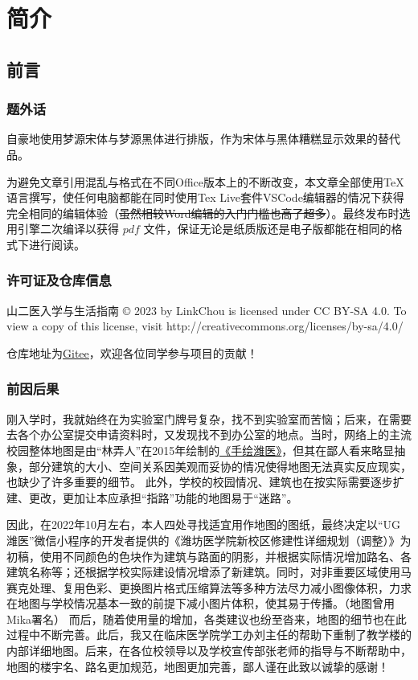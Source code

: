 \chapter[简介]{简介}

\section[前言]{前言}
\subsection[题外话]{题外话}
自豪地使用梦源宋体与梦源黑体进行排版，作为宋体与黑体糟糕显示效果的替代品。

为避免文章引用混乱与格式在不同Office版本上的不断改变，本文章全部使用\TeX 语言撰写，使任何电脑都能在同时使用Tex Live套件VSCode编辑器\footnotemark 的情况下获得完全相同的编辑体验（\sout{虽然相较Word编辑的入门门槛也高了超多}）。最终发布时选用\XeLaTeX 引擎二次编译以获得 $pdf$ 文件，保证无论是纸质版还是电子版都能在相同的格式下进行阅读。

\subsection[许可证及仓库信息]{许可证及仓库信息}
山二医入学与生活指南 © 2023 by LinkChou is licensed under CC BY-SA 4.0. To view a copy of this license, visit http://creativecommons.org/licenses/by-sa/4.0/

仓库地址为\uline{\href{https://gitee.com/mikazo/guide_for_freshman}{Gitee}}，欢迎各位同学参与项目的贡献！

\subsection[前因后果]{前因后果}
刚入学时，我就始终在为实验室门牌号复杂，找不到实验室而苦恼；后来，在需要去各个办公室提交申请资料时，又发现找不到办公室的地点。当时，网络上的主流校园整体地图是由“林弄人”在2015年绘制的\uline{\href{https://www.zcool.com.cn/work/ZMTgxMDQwMjg=.html?}{《手绘潍医》}}，但其在鄙人看来略显抽象，部分建筑的大小、空间关系因美观而妥协的情况使得地图无法真实反应现实，也缺少了许多重要的细节。
此外，学校的校园情况、建筑也在按实际需要逐步扩建、更改，更加让本应承担“指路”功能的地图易于“迷路”。

因此，在2022年10月左右，本人四处寻找适宜用作地图的图纸，最终决定以“UG潍医”微信小程序的开发者提供的《潍坊医学院新校区修建性详细规划（调整）》为初稿，使用不同颜色的色块作为建筑与路面的阴影，并根据实际情况增加路名、各建筑名称等；还根据学校实际建设情况增添了新建筑。同时，对非重要区域使用马赛克处理、复用色彩、更换图片格式压缩算法等多种方法尽力减小图像体积，力求在地图与学校情况基本一致的前提下减小图片体积，使其易于传播。（地图曾用Mika署名）
而后，随着使用量的增加，各类建议也纷至沓来，地图的细节也在此过程中不断完善。此后，我又在临床医学院学工办刘主任的帮助下重制了教学楼的内部详细地图。后来，在各位校领导以及学校宣传部张老师的指导与不断帮助中，地图的楼宇名、路名更加规范，地图更加完善，鄙人谨在此致以诚挚的感谢！

